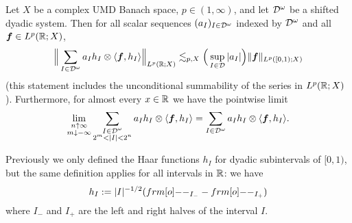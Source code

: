 \begin{thm}\label{thm:general-haar-decompositions}
  Let $X$ be a complex UMD Banach space, $p \in (1,\infty)$, and let $\mathcal{D}^{\omega}$ be a shifted dyadic system.
  Then for all scalar sequences $(a_{I})_{I \in \mathcal{D}^{\omega}}$ indexed by $\mathcal{D}^{\omega}$ and all $\bm{f} \in L^p(\mathbb{R};X)$,
  \begin{equation}\label{eq:generalised-haar}
    \Big\| \sum_{I \in \mathcal{D}^{\omega}} a_{I} h_{I} \otimes \langle \bm{f}, h_{I} \rangle \Big\|_{L^p(\mathbb{R};X)} \lesssim_{p,X} \Big(\sup_{I \in \mathcal{D}} |a_{I}| \Big) \|\bm{f}\|_{L^p([0,1);X)}
  \end{equation}
  (this statement includes the unconditional summability of the series in $L^p(\mathbb{R};X)$).
  Furthermore, for almost every $x \in \mathbb{R}$ we have the pointwise limit
  \begin{equation*}
    \lim_{\substack{n \uparrow \infty \\ m \downarrow -\infty}} \sum_{\substack{I \in \mathcal{D}^{\omega} \\ 2^{m} < |I| < 2^{n}}} a_{I} h_{I} \otimes \langle \bm{f}, h_{I} \rangle = \sum_{I \in \mathcal{D}^{\omega}} a_{I} h_{I} \otimes \langle \bm{f}, h_{I} \rangle.
  \end{equation*}
  
\end{thm}

\begin{rmk}
  Previously we only defined the Haar functions $h_{I}$ for dyadic subintervals of $[0,1)$, but the same definition applies for all intervals in $\mathbb{R}$:
  we have
  \begin{equation*}
    h_{I} := |I|^{-1/2}(\1_{I_{-}} - \1_{I_{+}})
  \end{equation*}
  where $I_{-}$ and $I_{+}$ are the left and right halves of the interval $I$.
\end{rmk}



